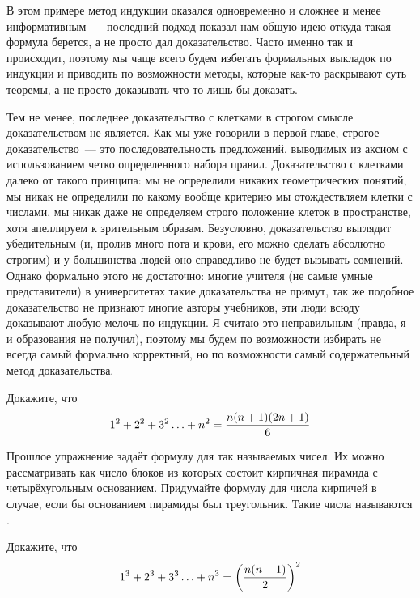 В этом примере метод индукции оказался одновременно и сложнее и менее информативным~--- последний подход показал нам общую идею откуда такая формула берется, а не просто дал доказательство. Часто именно так и происходит, поэтому мы чаще всего будем избегать формальных выкладок по индукции и приводить по возможности методы, которые как-то раскрывают суть теоремы, а не просто доказывать что-то лишь бы доказать.

Тем не менее, последнее доказательство с клетками в строгом смысле доказательством не является. Как мы уже говорили в первой главе, строгое доказательство~--- это последовательность предложений, выводимых из аксиом с использованием четко определенного набора правил. Доказательство с клетками далеко от такого принципа: мы не определили никаких геометрических понятий, мы никак не определили по какому вообще критерию мы отождествляем клетки с числами, мы никак даже не определяем строго положение клеток в пространстве, хотя апеллируем к зрительным образам. Безусловно, доказательство выглядит убедительным (и, пролив много пота и крови, его можно сделать абсолютно строгим) и у большинства людей оно справедливо не будет вызывать сомнений. Однако формально этого не достаточно: многие учителя (не самые умные представители) в университетах такие доказательства не примут, так же подобное доказательство не признают многие авторы учебников, эти люди всюду доказывают любую мелочь по индукции. Я считаю это неправильным (правда, я и образования не получил), поэтому мы будем по возможности избирать не всегда самый формально корректный, но по возможности самый содержательный метод доказательства.

\begin{exercise}
Докажите, что
$$1^2 + 2^2 +3^2 \ldots + n^2 = {n(n+1)(2n+1)\over 6}$$
\end{exercise}

\begin{exercise}
Прошлое упражнение задаёт формулу для так называемых  чисел. Их можно рассматривать как число блоков из которых состоит кирпичная пирамида с четырёхугольным основанием. Придумайте формулу для числа кирпичей в случае, если бы основанием пирамиды был треугольник. Такие числа называются .
\end{exercise}

\begin{exercise}
Докажите, что
$$1^3 + 2^3 +3^3 \ldots + n^3 = \left({n(n+1)\over 2}\right)^2$$
\end{exercise}

